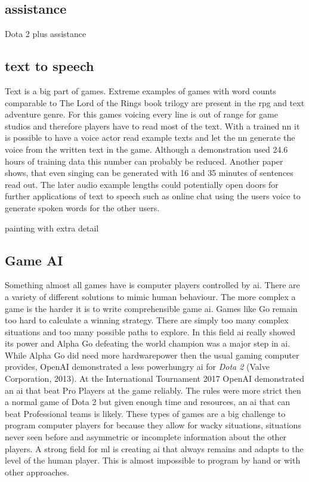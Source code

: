 \documentclass[10pt,a4paper]{article}
\begin{document}
\subsection{assistance}
Dota 2 plus assistance

\subsection{text to speech}
Text is a big part of games. Extreme examples of games with word counts comparable to The Lord of the Rings book trilogy are present in the \gls{rpg} and text adventure genre. For this games voicing every line is out of range for game studios and therefore players have to read most of the text. With a trained \gls{nn} it is possible to have a voice actor read example texts and let the \gls{nn} generate the voice from the written text in the game\cite{Shen2017}. Although a demonstration used 24.6 hours of training data this number can probably be reduced. Another paper shows, that even singing can be generated with 16 and 35 minutes of sentences read out\cite{Blaauw2017}. The later audio example lengths could potentially open doors for further applications of text to speech such as online chat using the users voice to generate spoken words for the other users.

\cite{Luan2018} painting with extra detail

\subsection{Game AI}
Something almost all games have is computer players controlled by \gls{ai}. There are a variety of different solutions to mimic human behaviour. The more complex a game is the harder it is to write comprehensible game \gls{ai}. Games like Go remain too hard to calculate a winning strategy. There are simply too many complex situations and too many possible paths to explore. In this field \gls{ai} really showed its power and Alpha Go defeating the world champion was a major step in \gls{ai}\cite{Silver2016}\cite{Silver2017}. While Alpha Go did need more hardwarepower then the usual gaming computer provides, OpenAI demonstrated a less powerhungry \gls{ai} for \textit{Dota 2} (Valve Corporation, 2013). At the International Tournament 2017 OpenAI demonstrated an \gls{ai} that beat Pro Players at the game reliably.\cite{Openai2017} The rules were more strict then a normal game of Dota 2 but given enough time and resources, an \gls{ai} that can beat Professional teams is likely. These types of games are a big challenge to program computer players for because they allow for wacky situations, situations never seen before and asymmetric or incomplete information about the other players. A strong field for \gls{ml} is creating \gls{ai} that always remains and adapts to the level of the human player. This is almost impossible to program by hand or with other approaches.
\end{document}
